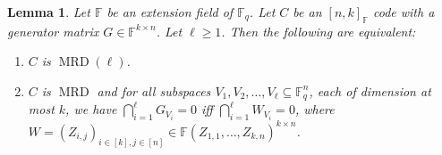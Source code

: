 \documentclass[11pt]{article}
\newif\ifmynotes
\newcommand{\ZZnote}[1]{\ifmynotes\textcolor{violet}{[Zihan: #1]}\else\fi}
\theoremstyle{plain}
\newtheorem{lemma}[thm]{Lemma}
\newtheorem{claim}[thm]{Claim}
\theoremstyle{definition}
\theoremstyle{remark}
\newcommand{\F}{\mathbb{F}}
\begin{document}
\begin{lemma}\label{null_inter_prop}
Let $\F$ be an extension field of $\F_q$.
Let $C$ be an $[n,k]_{\F}$ code with a generator matrix
$G\in \F^{k\times n}$. Let $\ell\geq 1$. Then the following are equivalent:
\begin{enumerate}
\item\label{item:mrd-generic} $C$ is $\operatorname{MRD}(\ell)$.
\item\label{item:mrd-ell} $C$ is $\operatorname{MRD}$ and for all subspaces $V_1,V_2,\dots,V_\ell\subseteq \F_q^n$, each of dimension at most $k$, we have $\bigcap_{i=1}^{\ell}G_{V_i}=0$ iff $\bigcap_{i=1}^{\ell}W_{V_i}=0$, where $W=(Z_{i,j})_{i\in [k], j\in [n]}\in\F(Z_{1,1},\dots,Z_{k,n})^{k\times n}$.
\end{enumerate}
\end{lemma}
\end{document}
